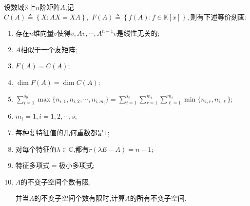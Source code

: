 \documentclass[../../main.tex]{subfiles}
\begin{document}
\begin{theorem}[F(A)=C(A)的充要条件和不变子空间刻画]\label{theorem:F(A)=C(A)的充要条件和不变子空间刻画}
设数域$\mathbb{K}$上$n$阶矩阵$A$,记$C\left( A \right) \triangleq \left\{ X:AX=XA \right\},\,\,
F\left( A \right) \triangleq \left\{ f\left( A \right) :f\in \mathbb{K} \left[ x \right] \right\} ,$则有下述等价刻画:
\begin{enumerate}[(1)]
\item 存在$n$维向量$v$使得$v,Av,\cdots,A^{n-1}v$是线性无关的;

\item $A$相似于一个友矩阵;

\item  $F(A)=C(A)$;

\item  $\dim F(A)=\dim C(A)$;

\item $\sum\limits_{i=1}^{s_0}\max\{n_{i,1},n_{i,2},\cdots,n_{i,m_i}\}=\sum\limits_{i=1}^{s_0}\sum\limits_{r=1}^{m_i}\sum\limits_{\ell=1}^{m_i}\min\{n_{i,r},n_{i,\ell}\}$;

\item $m_i=1,i=1,2,\cdots,s$;

\item 每种复特征值的几何重数都是$1$;

\item 对每个特征值$\lambda\in\mathbb{C}$,都有$r(\lambda E-A)=n-1$;

\item 特征多项式$=$极小多项式;

\item $A$的不变子空间个数有限.

并当$A$的不变子空间个数有限时,计算$A$的所有不变子空间.
\end{enumerate}
\end{theorem}
\end{document}

